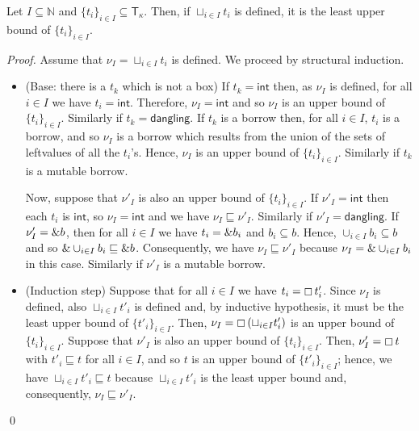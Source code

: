 \begin{lemma}\label{lemma:lub-type}
  Let $I\subseteq\mathbb{N}$ and $\{t_i\}_{i\in I}\subseteq\mathsf{T}_\kappa$.
  Then, if $\sqcup_{i\in I}t_i$ is defined, it is the least upper bound of
  $\{t_i\}_{i\in I}$.
\end{lemma}
\begin{proof}
  Assume that $\nu_I = \sqcup_{i\in I}t_i$ is defined.
  We proceed by structural induction.
  \begin{itemize}
    \item (Base: there is a $t_k$ which is not a box)
    If $t_k=\mathsf{int}$ then, as $\nu_I$ is defined, for all $i\in I$
    we have $t_i=\mathsf{int}$. Therefore, $\nu_I=\mathsf{int}$
    and so $\nu_I$ is an upper bound of $\{t_i\}_{i\in I}$.
    Similarly if $t_k=\mathsf{dangling}$.
    If $t_k$ is a borrow then, for all $i\in I$, $t_i$ is a borrow, and so
    $\nu_I$ is a borrow which results from the union of the sets of
    leftvalues of all the $t_i$'s. Hence, $\nu_I$ is an upper bound of
    $\{t_i\}_{i\in I}$.
    Similarly if $t_k$ is a mutable borrow.

    Now, suppose that $\nu'_I$ is also an upper bound of $\{t_i\}_{i\in I}$.
    If $\nu'_I=\mathsf{int}$ then each $t_i$ is $\mathsf{int}$, so
    $\nu_I=\mathsf{int}$ and we have $\nu_I\sqsubseteq\nu'_I$.
    Similarly if $\nu'_I=\mathsf{dangling}$.
    If $\nu'_I=\& b$, then for all $i\in I$ we have $t_i = \& b_i$
    and $b_i\subseteq b$. Hence, $\cup_{i\in I}b_i\subseteq b$ and so
    $\&\cup_{i\in I}b_i\sqsubseteq\& b$. Consequently, we have
    $\nu_I\sqsubseteq\nu'_I$ because $\nu_I=\&\cup_{i\in I}b_i$ in this case.
    Similarly if $\nu'_I$ is a mutable borrow.
    \item (Induction step) Suppose that for all $i\in I$ we have
    $t_i = \boxempty\,{t'_i}$. Since $\nu_I$ is defined, also
    $\sqcup_{i\in I}t'_i$ is defined and, by inductive hypothesis, it must be
    the least upper bound of $\{t'_i\}_{i\in I}$. Then,
    $\nu_I = \boxempty\,{(\sqcup_{i\in I}t'_i)}$ is an upper bound
    of $\{t_i\}_{i\in I}$. Suppose that $\nu'_I$ is also an upper bound
    of $\{t_i\}_{i\in I}$. Then, $\nu'_I=\boxempty\,{t}$ with
    $t'_i\sqsubseteq t$ for all $i\in I$, and so $t$ is an upper bound
    of $\{t'_i\}_{i\in I}$; hence, we have $\sqcup_{i\in I}t'_i\sqsubseteq t$
    because $\sqcup_{i\in I}t'_i$ is the least upper bound and,
    consequently, $\nu_I\sqsubseteq\nu'_I$.
  \end{itemize}
  \qed
\end{proof}

